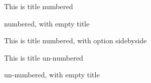 \documentclass{article}
\begin{document}
\begin{example}{This is title}
  numbered
\end{example}

\begin{example}{}
  numbered, with empty title
\end{example}

\begin{example}[sidebyside]{This is title}
  numbered, with option sidebyside
\end{example}


\begin{example*}{This is title}
  un-numbered
\end{example*}

\begin{example*}{}
  un-numbered, with empty title
\end{example*}
\end{document}
